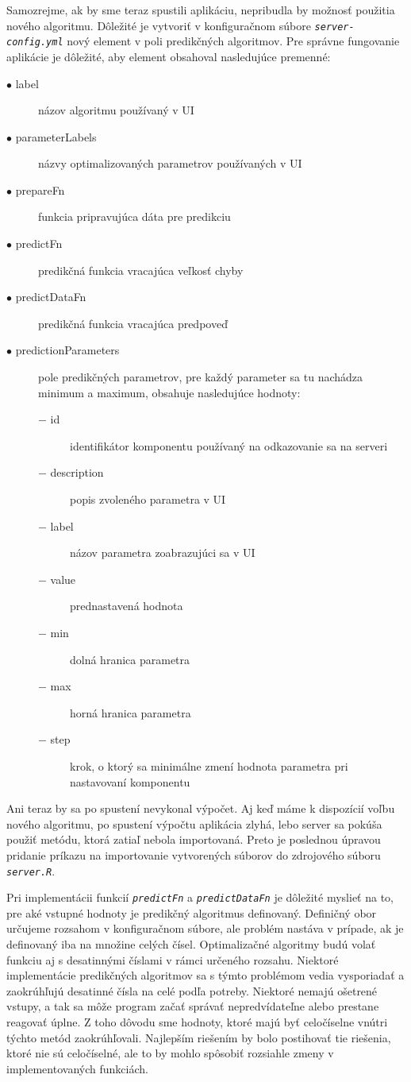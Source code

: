 \documentclass[a4paper,slovak,12pt,appendix]{article}
\begin{document}
Samozrejme, ak by sme teraz spustili aplikáciu, nepribudla by možnosť použitia
nového algoritmu. Dôležité je vytvoriť v konfiguračnom súbore
\texttt{\textit{server-config.yml}} nový element v poli predikčných algoritmov. Pre správne
fungovanie aplikácie je dôležité, aby element obsahoval nasledujúce premenné:
\begin{description}
  \item[$\bullet$ label] názov algoritmu používaný v UI
  \item[$\bullet$ parameterLabels] názvy optimalizovaných parametrov používaných v UI
  \item[$\bullet$ prepareFn] funkcia pripravujúca dáta pre predikciu
  \item[$\bullet$ predictFn] predikčná funkcia vracajúca veľkosť chyby
  \item[$\bullet$ predictDataFn] predikčná funkcia vracajúca predpoveď
  \item[$\bullet$ predictionParameters] pole predikčných parametrov, pre každý parameter sa
  tu nachádza minimum a maximum, obsahuje nasledujúce hodnoty:
  \begin{description}
    \item[$-$ id] identifikátor komponentu používaný na odkazovanie sa na serveri
		\item[$-$ description] popis zvoleného parametra v UI
    \item[$-$ label] názov parametra zoabrazujúci sa v UI
    \item[$-$ value] prednastavená hodnota
    \item[$-$ min] dolná hranica parametra
    \item[$-$ max] horná hranica parametra
    \item[$-$ step] krok, o ktorý sa minimálne zmení hodnota parametra pri nastavovaní komponentu
  \end{description}
\end{description}

Ani teraz by sa po spustení nevykonal výpočet. Aj keď máme k dispozícií voľbu
nového algoritmu, po spustení výpočtu aplikácia zlyhá, lebo server sa pokúša
použiť metódu, ktorá zatiaľ nebola importovaná. Preto je
poslednou úpravou pridanie príkazu na importovanie vytvorených súborov do
zdrojového súboru \texttt{\textit{server.R}}.

Pri implementácii funkcií \texttt{\textit{predictFn}} a \texttt{\textit{predictDataFn}} je dôležité myslieť
na to, pre aké vstupné hodnoty je predikčný algoritmus definovaný. Definičný
obor určujeme rozsahom v konfiguračnom súbore, ale problém nastáva v prípade,
ak je definovaný iba na množine celých čísel. Optimalizačné algoritmy budú
volať funkciu aj s desatinnými číslami v rámci určeného rozsahu. Niektoré
implementácie predikčných algoritmov sa s týmto problémom vedia vysporiadať
a zaokrúhľujú desatinné čísla na celé podľa potreby. Niektoré nemajú ošetrené
vstupy, a tak sa môže program začať správať nepredvídateľne alebo prestane
reagovať úplne. Z toho dôvodu sme hodnoty, ktoré majú byť celočíselne vnútri
týchto metód zaokrúhľovali. Najlepším riešením by bolo postihovať tie riešenia,
ktoré nie sú celočíselné, ale to by mohlo spôsobiť rozsiahle zmeny v
implementovaných funkciách.
\end{document}

